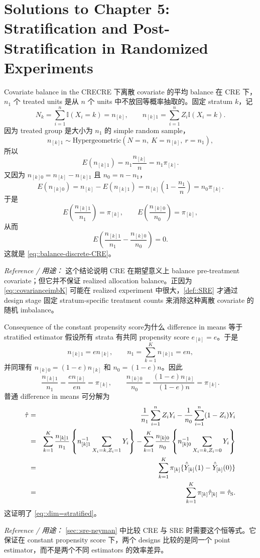 \chapter{Solutions to Chapter 5: Stratification and Post-Stratification in Randomized Experiments}
\label{sol:chapter05}

\begin{exercisesolution}{Covariate balance in the CRE}{CRE 下离散 covariate 的平均 balance}
在 CRE 下，$n_1$ 个 treated units 是从 $n$ 个 units 中不放回等概率抽取的。固定 stratum $k$，记
\[
N_k=\sum_{i=1}^n \mathbb{I}(X_i=k)=n_{[k]},\qquad
n_{[k]1}=\sum_{i=1}^n Z_i\mathbb{I}(X_i=k).
\]
因为 treated group 是大小为 $n_1$ 的 simple random sample，
\[
n_{[k]1}\sim \text{Hypergeometric}(N=n,\ K=n_{[k]},\ r=n_1),
\]
所以
\[
E(n_{[k]1})=n_1\frac{n_{[k]}}{n}=n_1\pi_{[k]}.
\]
又因为 $n_{[k]0}=n_{[k]}-n_{[k]1}$ 且 $n_0=n-n_1$，
\[
E(n_{[k]0})
=n_{[k]}-E(n_{[k]1})
=n_{[k]}\left(1-\frac{n_1}{n}\right)
=n_0\pi_{[k]}.
\]
于是
\[
E\left(\frac{n_{[k]1}}{n_1}\right)=\pi_{[k]},
\qquad
E\left(\frac{n_{[k]0}}{n_0}\right)=\pi_{[k]},
\]
从而
\[
E\left(\frac{n_{[k]1}}{n_1}-\frac{n_{[k]0}}{n_0}\right)=0.
\]
这就是 \cref{eq::balance-discrete-CRE}。

\emph{Reference / 用途：} 这个结论说明 CRE 在期望意义上 balance pre-treatment covariate；但它并不保证 realized allocation balance。正因为 \cref{eq::covarianceimbK} 可能在 realized experiment 中很大，\cref{def::SRE} 才通过 design stage 固定 stratum-specific treatment counts 来消除这种离散 covariate 的随机 imbalance。
\end{exercisesolution}

\begin{exercisesolution}{Consequence of the constant propensity score}{为什么 difference in means 等于 stratified estimator}
假设所有 strata 有共同 propensity score $e_{[k]}=e$。于是
\[
n_{[k]1}=e n_{[k]},\qquad n_1=\sum_{k=1}^K n_{[k]1}=e n,
\]
并同理有 $n_{[k]0}=(1-e)n_{[k]}$ 和 $n_0=(1-e)n$。因此
\[
\frac{n_{[k]1}}{n_1}
=\frac{e n_{[k]}}{e n}
=\pi_{[k]},
\qquad
\frac{n_{[k]0}}{n_0}
=\frac{(1-e)n_{[k]}}{(1-e)n}
=\pi_{[k]}.
\]
普通 difference in means 可分解为
\begin{eqnarray*}
\hat\tau
&=&\frac{1}{n_1}\sum_{i=1}^n Z_iY_i
-\frac{1}{n_0}\sum_{i=1}^n(1-Z_i)Y_i\\
&=&
\sum_{k=1}^K
\frac{n_{[k]1}}{n_1}
\left\{n_{[k]1}^{-1}\sum_{X_i=k,Z_i=1}Y_i\right\}
-
\sum_{k=1}^K
\frac{n_{[k]0}}{n_0}
\left\{n_{[k]0}^{-1}\sum_{X_i=k,Z_i=0}Y_i\right\}\\
&=&
\sum_{k=1}^K\pi_{[k]}\{\hat{\bar Y}_{[k]}(1)-\hat{\bar Y}_{[k]}(0)\}\\
&=&\sum_{k=1}^K\pi_{[k]}\hat\tau_{[k]}
=\hat\tau_{\textsc{S}}.
\end{eqnarray*}
这证明了 \cref{eq::dim=stratified}。

\emph{Reference / 用途：} \cref{sec::sre-neyman} 中比较 CRE 与 SRE 时需要这个恒等式。它保证在 constant propensity score 下，两个 designs 比较的是同一个 point estimator，而不是两个不同 estimators 的效率差异。
\end{exercisesolution}


